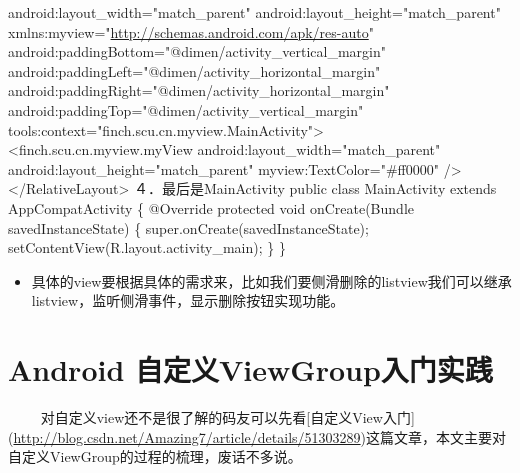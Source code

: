 \documentclass[9pt, b5paper]{article}
\begin{document}
    android:layout\_width="match\_parent"
    android:layout\_height="match\_parent"
    xmlns:myview="\url{http://schemas.android.com/apk/res-auto}"
    android:paddingBottom="@dimen/activity\_vertical\_margin"
    android:paddingLeft="@dimen/activity\_horizontal\_margin"
    android:paddingRight="@dimen/activity\_horizontal\_margin"
    android:paddingTop="@dimen/activity\_vertical\_margin"
    tools:context="finch.scu.cn.myview.MainActivity">
    <finch.scu.cn.myview.myView
        android:layout\_width="match\_parent"
        android:layout\_height="match\_parent"
        myview:TextColor="\#ff0000"
        />
</RelativeLayout>
４．最后是MainActivity
public class MainActivity extends AppCompatActivity \{
    @Override
    protected void onCreate(Bundle savedInstanceState) \{
        super.onCreate(savedInstanceState);
        setContentView(R.layout.activity\_main);
    \}
\}
\begin{itemize}
\item 具体的view要根据具体的需求来，比如我们要侧滑删除的listview我们可以继承listview，监听侧滑事件，显示删除按钮实现功能。
\end{itemize}
\section{Android 自定义ViewGroup入门实践}
\label{sec-11}
　　 对自定义view还不是很了解的码友可以先看[自定义View入门](\url{http://blog.csdn.net/Amazing7/article/details/51303289})这篇文章，本文主要对自定义ViewGroup的过程的梳理，废话不多说。
\end{document}
